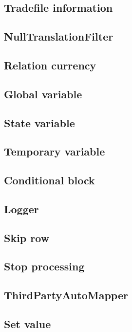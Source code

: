 \subsection{Tradefile information}

\subsection{NullTranslationFilter}

\subsection{Relation currency}

\subsection{Global variable}

\subsection{State variable}

\subsection{Temporary variable}

\subsection{Conditional block}

\subsection{Logger}

\subsection{Skip row}

\subsection{Stop processing}

\subsection{ThirdPartyAutoMapper}

\subsection{Set value}

